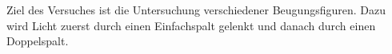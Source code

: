 Ziel des Versuches ist die Untersuchung verschiedener Beugungsfiguren.
Dazu wird Licht zuerst durch einen Einfachspalt gelenkt und danach durch einen Doppelspalt.